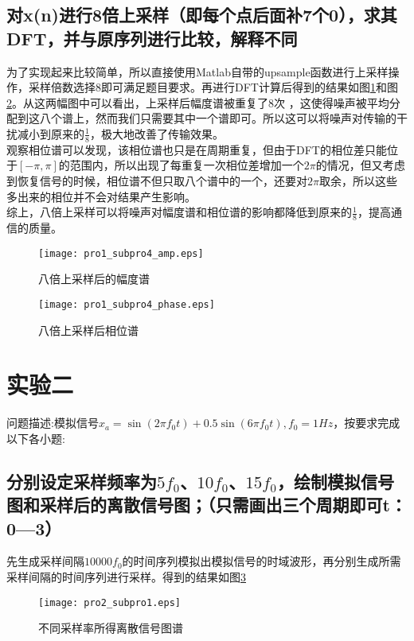 \documentclass[fleqn,10pt]{SelfArx} %
\begin{document}
\begin{CJK}{UTF8}{gkai}
\subsection{对x(n)进行8倍上采样（即每个点后面补7个0），求其DFT，并与原序列进行比较，解释不同}
为了实现起来比较简单，所以直接使用Matlab自带的upsample函数进行上采样操作，采样倍数选择8即可满足题目要求。再进行DFT计算后得到的结果如图\ref{pro1_fig5}和图\ref{pro1_fig6}。从这两幅图中可以看出，上采样后幅度谱被重复了8次 ，这使得噪声被平均分配到这八个谱上，然而我们只需要其中一个谱即可。所以这可以将噪声对传输的干扰减小到原来的$\frac{1}{8}$，极大地改善了传输效果。\\
观察相位谱可以发现，该相位谱也只是在周期重复，但由于DFT的相位差只能位于$[-\pi,\pi]$的范围内，所以出现了每重复一次相位差增加一个$2\pi$的情况，但又考虑到恢复信号的时候，相位谱不但只取八个谱中的一个，还要对$2\pi$取余，所以这些多出来的相位并不会对结果产生影响。\\
综上，八倍上采样可以将噪声对幅度谱和相位谱的影响都降低到原来的$\frac{1}{8}$，提高通信的质量。
\begin{figure}
  \centering
  \texttt{[image: pro1\_subpro4\_amp.eps]}
  \caption{八倍上采样后的幅度谱}
  \label{pro1_fig5}
\end{figure}

\begin{figure}
  \centering
  \texttt{[image: pro1\_subpro4\_phase.eps]}
  \caption{八倍上采样后相位谱}
  \label{pro1_fig6}
\end{figure}
\section{实验二}
问题描述:模拟信号$x_a=\sin(2\pi f_0t)+0.5\sin(6\pi f_0t),f_0=1Hz$，按要求完成以下各小题:
\subsection{分别设定采样频率为$5f_0$、$10f_0$、$15f_0$，绘制模拟信号图和采样后的离散信号图；（只需画出三个周期即可t：0—3）}
先生成采样间隔$10000f_0$的时间序列模拟出模拟信号的时域波形，再分别生成所需采样间隔的时间序列进行采样。得到的结果如图\ref{pro2_fig1}
\begin{figure}
  \centering
  \texttt{[image: pro2\_subpro1.eps]}
  \caption{不同采样率所得离散信号图谱}
  \label{pro2_fig1}
\end{figure}

\end{CJK}
\end{document}
